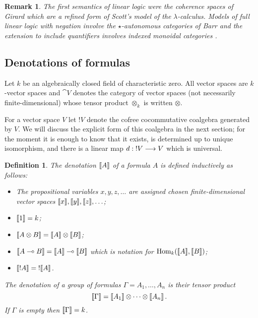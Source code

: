 \documentclass[english,letter paper,12pt,reqno]{article}
\theoremstyle{example}
\newtheorem{definition}[theorem]{Definition}
\newtheorem{remark}[theorem]{Remark}
\numberwithin{equation}{section}
\def\Hom{\operatorname{Hom}}
\begin{document}
\begin{remark} The first semantics of linear logic were the coherence spaces of Girard \cite[\S 3]{girard_llogic} which are a refined form of Scott's model of the $\lambda$-calculus. Models of full linear logic with negation involve the $\star$-autonomous categories of Barr \cite{barr_auto,barr_acc,barr_autolin} and the extension to include quantifiers involves indexed monoidal categories \cite{seely}.
\end{remark}

\subsection{Denotations of formulas}\label{section:denote_formula}

Let $k$ be an algebraically closed field of characteristic zero. All vector spaces are $k$-vector spaces and $\cat{V}$ denotes the category of vector spaces (not necessarily finite-dimensional) whose tensor product $\otimes_k$ is written $\otimes$.

For a vector space $V$ let ${!} V$ denote the cofree cocommutative coalgebra generated by $V$. We will discuss the explicit form of this coalgebra in the next section; for the moment it is enough to know that it exists, is determined up to unique isomorphism, and there is a linear map $d: {!} V \longrightarrow V$ which is universal.

\begin{definition}\label{defn:denotation_objects} The \emph{denotation} $\llbracket A \rrbracket$ of a formula $A$ is defined inductively as follows:
\begin{itemize}
\item The propositional variables $x, y, z, \ldots$ are assigned chosen finite-dimensional vector spaces $\llbracket x \rrbracket, \llbracket y \rrbracket, \llbracket z \rrbracket, \ldots$;
\item $\llbracket 1 \rrbracket = k$;
\item $\llbracket A \otimes B \rrbracket = \llbracket A \rrbracket \otimes \llbracket B \rrbracket$;
\item $\llbracket A \multimap B \rrbracket = \llbracket A \rrbracket \multimap \llbracket B \rrbracket$ which is notation for $\Hom_k(\den{A}, \den{B})$;
\item $\llbracket !A \rrbracket = {!} \llbracket A \rrbracket$.
\end{itemize}
The denotation of a group of formulas $\Gamma = A_1,\ldots,A_n$ is their tensor product
\[
\llbracket \Gamma \rrbracket = \llbracket A_1 \rrbracket \otimes \cdots \otimes \llbracket A_n \rrbracket\,.
\]
If $\Gamma$ is empty then $\llbracket \Gamma \rrbracket = k$.
\end{definition}
\end{document}
